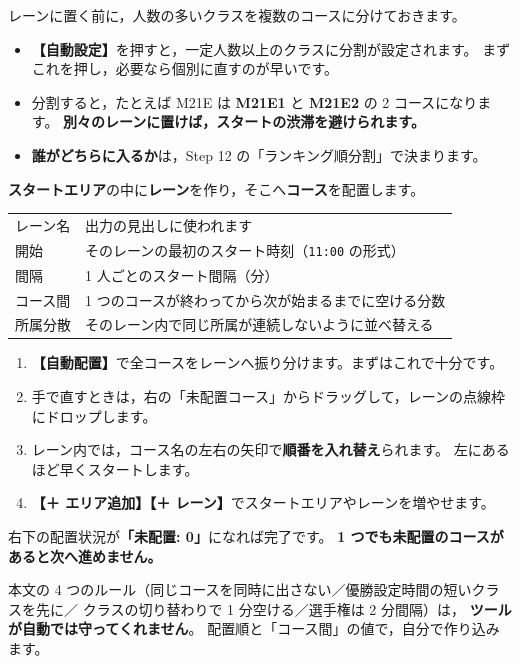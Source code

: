 \begin{J2M}
レーンに置く前に，人数の多いクラスを複数のコースに分けておきます。


\begin{itemize}
\item \textbf{【自動設定】}を押すと，一定人数以上のクラスに分割が設定されます。
      まずこれを押し，必要なら個別に直すのが早いです。
\item 分割すると，たとえば M21E は \textbf{M21E1} と \textbf{M21E2} の 2 コースになります。
      \textbf{別々のレーンに置けば，スタートの渋滞を避けられます。}
\item \textbf{誰がどちらに入るか}は，Step 12 の「ランキング順分割」で決まります。
\end{itemize}
\end{J2M}

\begin{J2M}
\textbf{スタートエリア}の中に\textbf{レーン}を作り，そこへ\textbf{コース}を配置します。


\begin{center}
\small
\begin{tabular}{@{}P{20mm}P{110mm}@{}}
\toprule
{} &  \\
\midrule
レーン名 & 出力の見出しに使われます \\
開始 & そのレーンの最初のスタート時刻（\texttt{11:00} の形式） \\
間隔 & 1 人ごとのスタート間隔（分） \\
コース間 & 1 つのコースが終わってから次が始まるまでに空ける分数 \\
所属分散 & そのレーン内で同じ所属が連続しないように並べ替える \\
\bottomrule
\end{tabular}
\end{center}

\begin{enumerate}
\item \textbf{【自動配置】}で全コースをレーンへ振り分けます。まずはこれで十分です。
\item 手で直すときは，右の「未配置コース」からドラッグして，レーンの点線枠にドロップします。
\item レーン内では，コース名の左右の矢印で\textbf{順番を入れ替え}られます。
      左にあるほど早くスタートします。
\item \textbf{【＋ エリア追加】【＋ レーン】}でスタートエリアやレーンを増やせます。
\end{enumerate}

右下の配置状況が\textbf{「未配置: 0」}になれば完了です。
\textbf{1 つでも未配置のコースがあると次へ進めません。}

本文の 4 つのルール（同じコースを同時に出さない／優勝設定時間の短いクラスを先に／
クラスの切り替わりで 1 分空ける／選手権は 2 分間隔）は，
\textbf{ツールが自動では守ってくれません}。
配置順と「コース間」の値で，自分で作り込みます。
\end{J2M}

